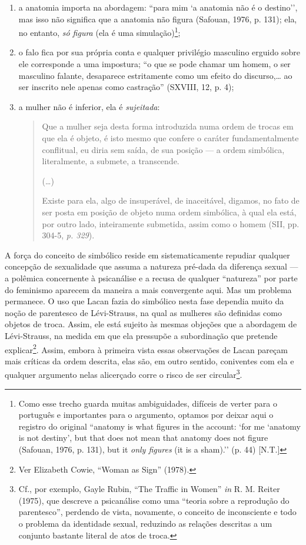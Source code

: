 \begin{enumerate}
\def\labelenumi{\arabic{enumi})}
\item
  a anatomia importa na abordagem: ``para mim `a anatomia não é o
  destino'', mas isso não significa que a anatomia não figura (Safouan,
  1976, p. 131); ela, no entanto, \emph{só figura} (ela é uma
  simulação)\footnote{Como esse trecho guarda muitas ambiguidades,
    difíceis de verter para o português e importantes para o argumento,
    optamos por deixar aqui o registro do original ``anatomy is what
    figures in the account: `for me `anatomy is not destiny', but that
    does not mean that anatomy does not figure (Safouan, 1976, p. 131),
    but it \emph{only figures} (it is a sham).'' (p. 44) {[}N.T.{]}};
\item
  o falo fica por sua própria conta e qualquer privilégio masculino
  erguido sobre ele corresponde a uma impostura; ``o que se pode chamar
  um homem, o ser masculino falante, desaparece estritamente como um
  efeito do discurso,\ldots{} ao ser inscrito nele apenas como castração''
  (SXVIII, 12, p. 4);
\item
  a mulher não é inferior, ela é \emph{sujeitada}:
\begin{quote}
Que a mulher seja desta forma introduzida numa ordem de trocas em que
ela é objeto, é isto mesmo que confere o caráter fundamentalmente
conflitual, eu diria sem saída, de sua posição --- a ordem simbólica,
literalmente, a submete, a transcende.

(\ldots{})

Existe para ela, algo de insuperável, de inaceitável, digamos, no fato
de ser posta em posição de objeto numa ordem simbólica, à qual ela está,
por outro lado, inteiramente submetida, assim como o homem (SII, pp.
304-5, \emph{p. 329}).
\end{quote}
\end{enumerate}

A força do conceito de simbólico reside em sistematicamente repudiar
qualquer concepção de sexualidade que assuma a natureza pré-dada da
diferença sexual --- a polêmica concernente à psicanálise e a recusa de
qualquer ``natureza'' por parte do feminismo aparecem da maneira a mais
convergente aqui. Mas um problema permanece. O uso que Lacan fazia do
simbólico nesta fase dependia muito da noção de parentesco de
Lévi-Strauss, na qual as mulheres são definidas como objetos de troca.
Assim, ele está sujeito às mesmas objeções que a abordagem de
Lévi-Strauss, na medida em que ela pressupõe a subordinação que pretende
explicar\footnote{Ver Elizabeth Cowie, ``Woman as Sign'' (1978).}.
Assim, embora à primeira vista essas observações de Lacan pareçam mais
críticas da ordem descrita, elas são, em outro sentido, coniventes com
ela e qualquer argumento nelas alicerçado corre o risco de ser
circular\footnote{Cf., por exemplo, Gayle Rubin, ``The Traffic in Women''
  \emph{in} R. M. Reiter (1975), que descreve a psicanálise como uma
  ``teoria sobre a reprodução do parentesco'', perdendo de vista,
  novamente, o conceito de inconsciente e todo o problema da identidade
  sexual, reduzindo as relações descritas a um conjunto bastante literal
  de atos de troca.}.

